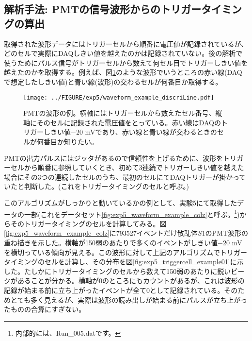 \documentclass[../../main.tex]{subfiles}
\numberwithin{equation}{section}
\numberwithin{table}{section}
\numberwithin{figure}{section}
\begin{document}
    



  \FloatBarrier
  \subsection{解析手法: PMTの信号波形からのトリガータイミングの算出}\label{sec:PMT_discriCell}
    取得された波形データにはトリガーセルから順番に電圧値が記録されているが、どのセルで実際にDAQしきい値を越えたのかは記録されていない。後の解析で使うためにパルス信号がトリガーセルから数えて何セル目でトリガーしきい値を越えたのかを取得する。例えば、図\ref{fig:exp5_waveform_example_discriLine}のような波形でいうところの赤い線(DAQで想定したしきい値)と青い線(波形)の交わるセルが何番目か取得する。
    \begin{figure}[tbp]
      \centering
      \texttt{[image: ../FIGURE/exp5/waveform\_example\_discriLine.pdf]}
      \caption{PMTの波形の例。横軸にはトリガーセルから数えたセル番号、縦軸にそのセルに記録された電圧値をとっている。赤い線はDAQのトリガーしきい値$-20$ \si{\milli\volt}であり、赤い線と青い線が交わるときのセルが何番目か知りたい。}
      \label{fig:exp5_waveform_example_discriLine}
    \end{figure}
    
    PMTの出力パルスにはジッタがあるので信頼性を上げるために、波形をトリガーセルから順番に参照していくとき、初めて3連続でトリガーしきい値を越えた場合にその3つの連続したセルのうち、最初のセルにてDAQトリガーが掛かっていたと判断した。(これをトリガータイミングのセルと呼ぶ。)

    このアルゴリズムがしっかりと動いているかの例として、実験5にて取得したデータの一部(これをデータセット\ref{fig:exp5_waveform_example_colz}と呼ぶ。\footnote{内部的には、Run\_005.datです。})からそのトリガータイミングのセルを計算してみる。図\ref{fig:exp5_waveform_example_colz}に793527イベントだけ散乱体$S1$のPMT波形の重ね描きを示した。横軸が150弱のあたりで多くのイベントがしきい値$-20$ \si{\milli\volt}を横切っている傾向が見える。この波形に対して上記のアルゴリズムでトリガータイミングのセルを計算し、その分布を図\ref{fig:exp5_triggercell_example01}に示した。たしかにトリガータイミングのセルから数えて150弱のあたりに鋭いピークがあることが分かる。横軸が0のところにもカウントがあるが、これは波形の記録が始まる前に立ち上がったイベントが全て0として記録されている。そのためとても多く見えるが、実際は波形の読み出しが始まる前にパルスが立ち上がったものの合算にすぎない。
\end{document}
